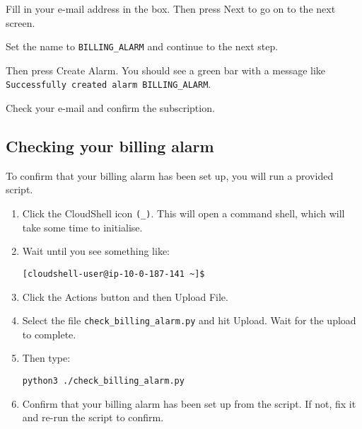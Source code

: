 Fill in your e-mail address in the box.
Then press Next to go on to the next screen.

Set the name to \texttt{BILLING\_ALARM} and continue to the next step. 

Then press Create Alarm.
You should see a green bar with a message like \texttt{Successfully created alarm BILLING\_ALARM}.

Check your e-mail and confirm the subscription.

\subsection{Checking your billing alarm}

To confirm that your billing alarm has been set up, you will run a provided script.
\begin{enumerate}
\item Click the CloudShell icon \texttt{(\textrangle\_)}.
  This will open a command shell, which will take some time to initialise.

\item Wait until you see something like:
\begin{verbatim}
[cloudshell-user@ip-10-0-187-141 ~]$ 
\end{verbatim}

\item Click the Actions button and then Upload File.

\item Select the file \texttt{check\_billing\_alarm.py} and hit Upload.
  Wait for the upload to complete.

\item Then type:
\begin{verbatim}
python3 ./check_billing_alarm.py
\end{verbatim}

\item Confirm that your billing alarm has been set up from the script.
  If not, fix it and re-run the script to confirm. 

\end{enumerate}

